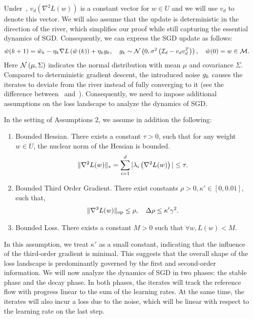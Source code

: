 Under~, $v_d(\nabla^2 L(w))$ is a constant vector for $w\in U$ and we will use $v_d$ to denote this vector. We will also assume that the update is deterministic in the direction of the river, which simplifies our proof while still capturing the essential dynamics of SGD. Consequently, we can express the SGD update as follows:
\begin{align}
    \tilde w(k + 1) = \tilde w_k - \eta_k \nabla L\left(\tilde w\left(k\right)\right)  + \eta_k {g}_k, \quad {g}_k \sim \mathcal{N} \left(0, \sigma^2 \left(\mathcal{I}_d - v_d v_d^T \right)\right), \quad \tilde w(0) = w \in \mathcal{M}.  \label{eq:sgd}
\end{align}
Here $\mathcal{N} \left(\mu, \Sigma\right)$ indicates the normal distribution with mean $\mu$ and covariance $\Sigma$. Compared to deterministic gradient descent, the introduced noise ${g}_k$ causes the iterates to deviate from the river instead of fully converging to it (see the difference between~ and~). Consequently, we need to impose additional assumptions on the loss landscape to analyze the dynamics of SGD.

\begin{assumption}
\label{assum:noise}
In the setting of Assumptions 2, we assume in addition the following:
\begin{enumerate}[leftmargin=*]
    \item {Bounded Hessian.} There exists a constant $\tau > 0$, such that for any weight $w \in U$, the nuclear norm of the Hessian is bounded. 
    $$\| \nabla^2 L(w) \|_{*}  =  \sum\limits_{i = 1}^{d} |\lambda_{i}\left(\nabla^2 L(w)\right)| \le \tau. $$
    \item {Bounded Third Order Gradient.} There exist  constants $\rho > 0, \kappa' \in [0, 0.01]$, such that,
    \begin{align*}
        \| \nabla^3  L(w) \|_{\textup{op}} \le \rho, \quad \Delta \rho \le \kappa' \gamma^2.
    \end{align*}
    \item {Bounded Loss.} There exists a constant $M > 0$ such that $\forall w, L(w) < M$.
\end{enumerate}
\end{assumption}

In this assumption, we treat $\kappa'$ as a small constant, indicating that the influence of the third-order gradient is minimal. This suggests that the overall shape of the loss landscape is predominantly governed by the first and second-order information. 
We will now analyze the dynamics of SGD in two phases: the stable phase and the decay phase. In both phases, the iterates will track the reference flow with progress linear to the sum of the learning rates. At the same time, the iterates will also incur a loss due to the noise, which will be linear with respect to the learning rate on the last step.



